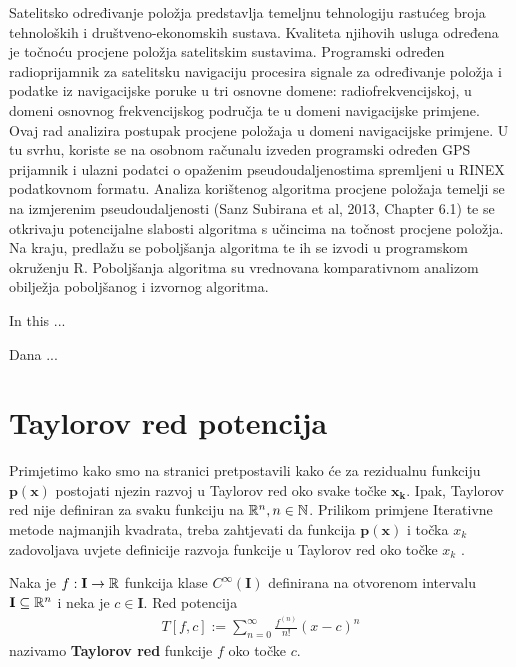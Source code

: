 \documentclass[a4paper,twoside,12pt]{memoir} %
\begin{document}


\pagestyle{empty} %


\begin{sazetak}
Satelitsko određivanje položja predstavlja temeljnu
tehnologiju rastućeg broja tehnoloških i društveno-ekonomskih sustava.
Kvaliteta njihovih
usluga određena je točnoću procjene položja
satelitskim sustavima.
Programski određen radioprijamnik za satelitsku navigaciju
procesira signale za određivanje položja i podatke
iz navigacijske poruke
u tri osnovne domene: radiofrekvencijskoj, u domeni osnovnog frekvencijskog
područja te u domeni navigacijske primjene.
Ovaj rad analizira postupak procjene položaja
u domeni navigacijske primjene. U tu svrhu, koriste se na osobnom računalu
izveden programski određen GPS prijamnik i ulazni podatci
o opaženim pseudoudaljenostima spremljeni
u RINEX podatkovnom formatu.
Analiza korištenog algoritma procjene položaja
temelji se na izmjerenim pseudoudaljenosti (Sanz Subirana et al, 2013, Chapter 6.1)
te se otkrivaju potencijalne slabosti algoritma
s učincima na točnost procjene položja. Na kraju, predlažu se poboljšanja
algoritma te ih se izvodi u programskom okruženju R. 
Poboljšanja algoritma su vrednovana komparativnom analizom obilježja
poboljšanog i izvornog algoritma.
\end{sazetak}

\begin{summary}
In this ...
\end{summary}


\begin{cv}
Dana ...
\end{cv}

\appendix

\chapter{Taylorov red potencija}\label{appendix:aTay}
Primjetimo kako smo na stranici \pageref{stranica:NGLin} pretpostavili
kako će za rezidualnu funkciju $\mathbf{p}(\mathbf{x})$ postojati njezin 
razvoj u Taylorov red oko svake točke $\mathbf{x_k}$. Ipak,
Taylorov red nije definiran za svaku funkciju na $\mathbb{R}^n, n \in \mathbb{N}$.
Prilikom primjene Iterativne metode najmanjih kvadrata, treba zahtjevati da 
funkcija $\mathbf{p}(\mathbf{x})$ i točka $x_k$ zadovoljava uvjete definicije razvoja funkcije u Taylorov red oko točke $x_k$ \cite{math:tay}.
\begin{defn}
	Naka je $f: \mathbf{I} \to \mathbb{R} $ funkcija klase $C^\infty(\mathbf{I})$ definirana
	na otvorenom intervalu $\mathbf{I} \subseteq \mathbb{R}^n$ i neka je $c \in \mathbf{I}$.
	Red potencija
	\begin{align}
	T \left[f,c\right] := \sum_{n=0}^{\infty} \frac{f^{(n)}}{n!} \left(x - c\right)^n
	\end{align}
	nazivamo \textbf{Taylorov red} funkcije $f$ oko točke $c$.
\end{defn}%
\end{document}
